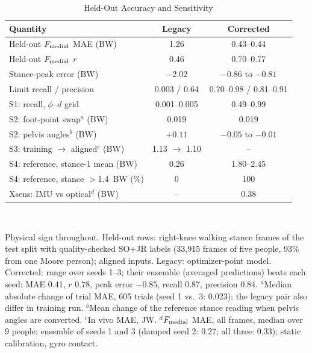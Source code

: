 \begin{table}[t]
\caption{Held-Out Accuracy and Sensitivity}
\label{tab:sens}
\centering\footnotesize
\setlength{\tabcolsep}{3pt}
\begin{tabular}{@{}lcc@{}}
\toprule
Quantity & Legacy & Corrected\\
\midrule
Held-out $F_{\mathrm{medial}}$ MAE (BW)                 & 1.26 & 0.43--0.44\\
Held-out $F_{\mathrm{medial}}$ $r$                      & 0.46 & 0.70--0.77\\
Stance-peak error (BW)                    & $-2.02$ & $-0.86$ to $-0.81$\\
Limit recall / precision                  & 0.003 / 0.64 & 0.70--0.98 / 0.81--0.91\\
S1: recall, $\phi$--$d$ grid              & 0.001--0.005 & 0.49--0.99\\
S2: foot-point swap$^a$ (BW)              & 0.019 & 0.019\\
S2: pelvis angles$^b$ (BW)                & $+0.11$ & $-0.05$ to $-0.01$\\
S3: training $\to$ aligned$^c$ (BW)       & 1.13 $\to$ 1.10 & --\\
S4: reference, stance-1 mean (BW)         & 0.26 & 1.80--2.45\\
S4: reference, stance $>$1.4~BW (\%)      & 0 & 100\\
Xsens: IMU vs optical$^d$ (BW)            & -- & 0.38\\
\bottomrule
\end{tabular}\\[2pt]
\parbox{\columnwidth}{\scriptsize Physical sign throughout. Held-out rows: right-knee walking
stance frames of the test split with quality-checked SO+JR labels (33,915 frames of five people,
93\% from one Moore person); aligned inputs. Legacy: optimizer-point model. Corrected: range over
seeds 1--3; their ensemble (averaged predictions) beats each seed: MAE 0.41, $r$ 0.78, peak error
$-0.85$, recall 0.87, precision 0.84. $^a$Median absolute change of trial MAE, 605 trials (seed 1
vs.\ 3: 0.023); the legacy pair also differ in training run. $^b$Mean change of the reference
stance reading when pelvis angles are converted. $^c$In vivo MAE, JW. $^d$$F_{\mathrm{medial}}$ MAE, all
frames, median over 9 people; ensemble of seeds 1 and 3 (damped seed 2: 0.27; all three: 0.33);
static calibration, gyro contact.}
\end{table}

